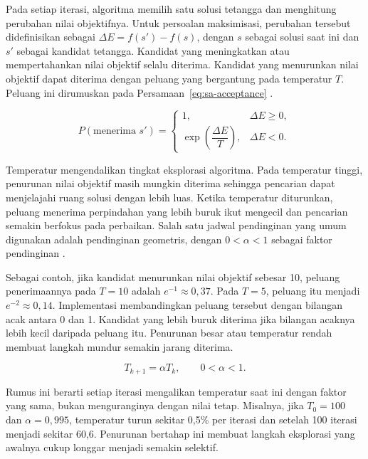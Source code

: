 Pada setiap iterasi, algoritma memilih satu solusi tetangga dan menghitung perubahan nilai objektifnya. Untuk persoalan maksimisasi, perubahan tersebut didefinisikan sebagai $\Delta E=f(s')-f(s)$, dengan $s$ sebagai solusi saat ini dan $s'$ sebagai kandidat tetangga. Kandidat yang meningkatkan atau mempertahankan nilai objektif selalu diterima. Kandidat yang menurunkan nilai objektif dapat diterima dengan peluang yang bergantung pada temperatur $T$. Peluang ini dirumuskan pada Persamaan~\ref{eq:sa-acceptance} \cite{kirkpatrick1983optimization}.

\begin{equation}
    P(\text{menerima } s') =
    \begin{cases}
        1,                                    & \Delta E \geq 0, \\
        \exp\left(\dfrac{\Delta E}{T}\right), & \Delta E < 0.
    \end{cases}
    \label{eq:sa-acceptance}
\end{equation}

Temperatur mengendalikan tingkat eksplorasi algoritma. Pada temperatur tinggi, penurunan nilai objektif masih mungkin diterima sehingga pencarian dapat menjelajahi ruang solusi dengan lebih luas. Ketika temperatur diturunkan, peluang menerima perpindahan yang lebih buruk ikut mengecil dan pencarian semakin berfokus pada perbaikan. Salah satu jadwal pendinginan yang umum digunakan adalah pendinginan geometris, dengan $0<\alpha<1$ sebagai faktor pendinginan \cite{russell2021artificial}.

Sebagai contoh, jika kandidat menurunkan nilai objektif sebesar 10, peluang penerimaannya pada $T=10$ adalah $e^{-1}\approx0{,}37$. Pada $T=5$, peluang itu menjadi $e^{-2}\approx0{,}14$. Implementasi membandingkan peluang tersebut dengan bilangan acak antara 0 dan 1. Kandidat yang lebih buruk diterima jika bilangan acaknya lebih kecil daripada peluang itu. Penurunan besar atau temperatur rendah membuat langkah mundur semakin jarang diterima.

\begin{equation}
    T_{k+1}=\alpha T_k, \qquad 0<\alpha<1.
    \label{eq:sa-cooling}
\end{equation}

Rumus ini berarti setiap iterasi mengalikan temperatur saat ini dengan faktor yang sama, bukan menguranginya dengan nilai tetap. Misalnya, jika $T_0=100$ dan $\alpha=0{,}995$, temperatur turun sekitar 0,5\% per iterasi dan setelah 100 iterasi menjadi sekitar 60,6. Penurunan bertahap ini membuat langkah eksplorasi yang awalnya cukup longgar menjadi semakin selektif.

